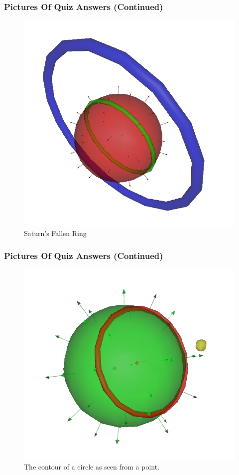 \documentclass{beamer}
\begin{document}
\begin{frame}
\frametitle{Pictures Of Quiz Answers (Continued)}
\begin{figure}
\centering
\includegraphics[scale=0.3]{FallenRingOfSaturn}
\caption{Saturn's Fallen Ring}
\end{figure}
\end{frame}

\begin{frame}
\frametitle{Pictures Of Quiz Answers (Continued)}
\begin{figure}
\centering
\includegraphics[scale=0.4]{ContourOfCircleFromPoint}
\caption{The contour of a circle as seen from a point.}
\end{figure}
\end{frame}
\end{document}
